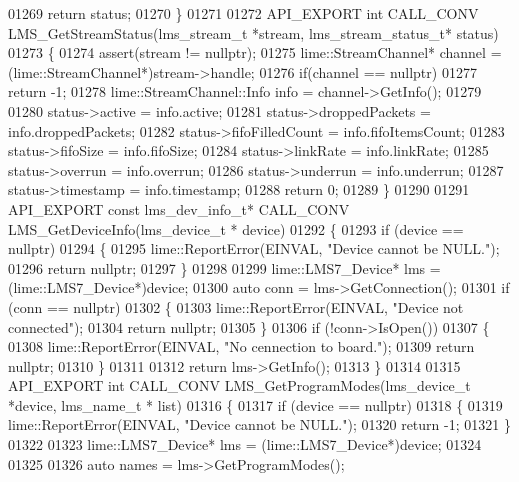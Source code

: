\begin{DoxyCode}
01269     \textcolor{keywordflow}{return} status;
01270 \}
01271 
01272 API_EXPORT \textcolor{keywordtype}{int} CALL_CONV LMS_GetStreamStatus(lms_stream_t *stream, 
      lms_stream_status_t* status)
01273 \{
01274     assert(stream != \textcolor{keyword}{nullptr});
01275     lime::StreamChannel* channel = (lime::StreamChannel*)stream->handle;
01276     \textcolor{keywordflow}{if}(channel == \textcolor{keyword}{nullptr})
01277         \textcolor{keywordflow}{return} -1;
01278     lime::StreamChannel::Info info = channel->GetInfo();
01279 
01280     status->active = info.active;
01281     status->droppedPackets = info.droppedPackets;
01282     status->fifoFilledCount = info.fifoItemsCount;
01283     status->fifoSize = info.fifoSize;
01284     status->linkRate = info.linkRate;
01285     status->overrun = info.overrun;
01286     status->underrun = info.underrun;
01287     status->timestamp = info.timestamp;
01288     \textcolor{keywordflow}{return} 0;
01289 \}
01290 
01291 API_EXPORT \textcolor{keyword}{const} lms_dev_info_t* CALL_CONV LMS_GetDeviceInfo(lms_device_t *
      device)
01292 \{
01293     \textcolor{keywordflow}{if} (device == \textcolor{keyword}{nullptr})
01294     \{
01295         lime::ReportError(EINVAL, \textcolor{stringliteral}{"Device cannot be NULL."});
01296         \textcolor{keywordflow}{return} \textcolor{keyword}{nullptr};
01297     \}
01298 
01299     lime::LMS7_Device* lms = (lime::LMS7_Device*)device;
01300     \textcolor{keyword}{auto} conn = lms->GetConnection();
01301     \textcolor{keywordflow}{if} (conn == \textcolor{keyword}{nullptr})
01302     \{
01303         lime::ReportError(EINVAL, \textcolor{stringliteral}{"Device not connected"});
01304         \textcolor{keywordflow}{return} \textcolor{keyword}{nullptr};
01305     \}
01306     \textcolor{keywordflow}{if} (!conn->IsOpen())
01307     \{
01308        lime::ReportError(EINVAL, \textcolor{stringliteral}{"No cennection to board."});
01309        \textcolor{keywordflow}{return} \textcolor{keyword}{nullptr};
01310     \}
01311 
01312     \textcolor{keywordflow}{return} lms->GetInfo();
01313 \}
01314 
01315 API_EXPORT \textcolor{keywordtype}{int} CALL_CONV LMS_GetProgramModes(lms_device_t *device, lms_name_t *
      list)
01316 \{
01317     \textcolor{keywordflow}{if} (device == \textcolor{keyword}{nullptr})
01318     \{
01319         lime::ReportError(EINVAL, \textcolor{stringliteral}{"Device cannot be NULL."});
01320         \textcolor{keywordflow}{return} -1;
01321     \}
01322 
01323     lime::LMS7_Device* lms = (lime::LMS7_Device*)device;
01324 
01325 
01326     \textcolor{keyword}{auto} names = lms->GetProgramModes();

\end{DoxyCode}
